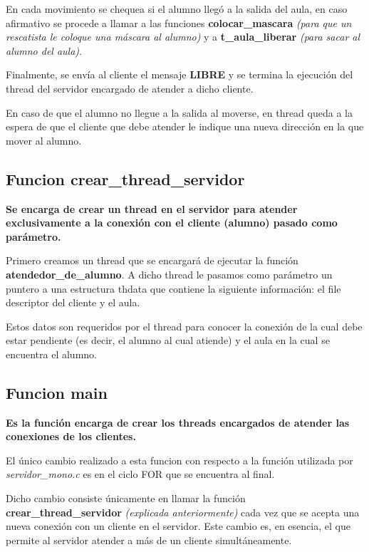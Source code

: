 En cada movimiento se chequea si el alumno llegó a la salida del aula, en caso afirmativo se procede a llamar a las funciones \textbf{colocar\_mascara} \textit{(para que un rescatista le coloque una máscara al alumno)} y a \textbf{t\_aula\_liberar} \textit{(para sacar al alumno del aula)}.

Finalmente, se envía al cliente el mensaje \textbf{LIBRE} y se termina la ejecución del thread del servidor encargado de atender a dicho cliente.

En caso de que el alumno no llegue a la salida al moverse, en thread queda a la espera de que el cliente que debe atender le indique una nueva dirección en la que mover al alumno.


\subsection{Funcion crear\_thread\_servidor}
\textbf{Se encarga de crear un thread en el servidor para atender exclusivamente a la conexión con el cliente (alumno) pasado como parámetro.}

Primero creamos un thread que se encargará de ejecutar la función \textbf{atendedor\_de\_alumno}. A dicho thread le pasamos como parámetro un puntero a una estructura thdata que contiene la siguiente información: el file descriptor del cliente y el aula.

Estos datos son requeridos por el thread para conocer la conexión de la cual debe estar pendiente (es decir, el alumno al cual atiende) y el aula en la cual se encuentra el alumno. 


\subsection{Funcion main}
\textbf{Es la función encarga de crear los threads encargados de atender las conexiones de los clientes.}

El único cambio realizado a esta funcion con respecto a la función utilizada por \textit{servidor\_mono.c} es en el ciclo FOR que se encuentra al final.

Dicho cambio consiste únicamente en llamar la función \textbf{crear\_thread\_servidor} \textit{(explicada anteriormente)} cada vez que se acepta una nueva conexión con un cliente en el servidor.
Este cambio es, en esencia, el que permite al servidor atender a más de un cliente simultáneamente.